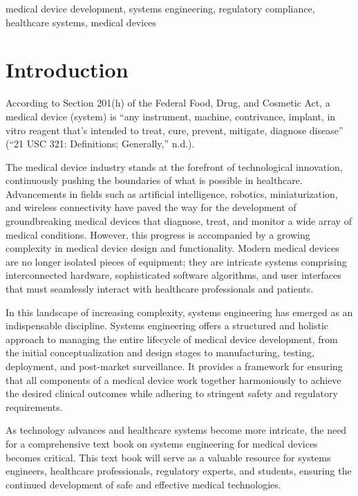 \documentclass[conference]{IEEEtran}
\begin{document}
\begin{IEEEkeywords}
    medical device development, systems engineering, regulatory compliance,
    healthcare systems, medical devices
\end{IEEEkeywords}

\section{Introduction}
    According to Section 201(h) of the Federal Food, Drug, and Cosmetic Act, 
    a medical device (system) is “any instrument, machine, contrivance, implant, 
    in vitro reagent that’s intended to treat, cure, prevent, mitigate, 
    diagnose disease” (“21 USC 321: Definitions; Generally,” n.d.).

    The medical device industry stands at the forefront of technological 
    innovation, continuously pushing the boundaries of what is possible in 
    healthcare. Advancements in fields such as artificial intelligence, 
    robotics, miniaturization, and wireless connectivity have paved the way 
    for the development of groundbreaking medical devices that diagnose, 
    treat, and monitor a wide array of medical conditions. However, this 
    progress is accompanied by a growing complexity in medical device design 
    and functionality. Modern medical devices are no longer isolated pieces of 
    equipment; they are intricate systems comprising interconnected hardware, 
    sophisticated software algorithms, and user interfaces that must seamlessly 
    interact with healthcare professionals and patients.

    In this landscape of increasing complexity, systems engineering has 
    emerged as an indispensable discipline. Systems engineering offers a 
    structured and holistic approach to managing the entire lifecycle of 
    medical device development, from the initial conceptualization and design 
    stages to manufacturing, testing, deployment, and post-market surveillance. 
    It provides a framework for ensuring that all components of a medical 
    device work together harmoniously to achieve the desired clinical outcomes 
    while adhering to stringent safety and regulatory requirements.

    As technology advances and healthcare systems become more intricate, 
    the need for a comprehensive text book on systems engineering for medical 
    devices becomes critical. This text book will serve as a valuable resource for 
    systems engineers, healthcare professionals, regulatory experts, and 
    students, ensuring the continued development of safe and effective medical 
    technologies.
\end{document}
